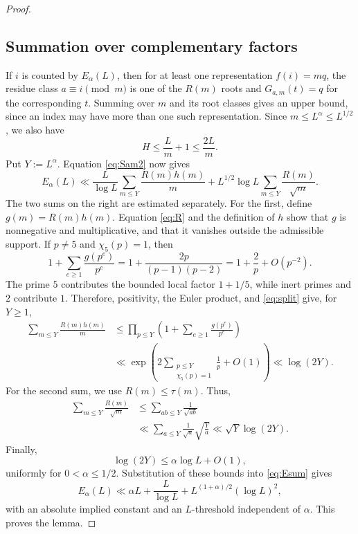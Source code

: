 \documentclass[11pt]{amsart}
\theoremstyle{definition}
\theoremstyle{remark}
\begin{document}
\begin{proof}
\subsection{Summation over complementary factors}

If $i$ is counted by $E_\alpha(L)$,
then for at least one representation $f(i)=mq$, the residue class
$a\equiv i\pmod m$ is one of the $R(m)$ roots and $G_{a,m}(t)=q$ for the
corresponding $t$. Summing over $m$ and its root classes gives an upper
bound, since an index may have more than one such representation.
Since $m\leq L^\alpha\leq L^{1/2}$, we also have
\[
H\leq\frac Lm+1\leq\frac{2L}{m}.
\]
Put $Y:=L^\alpha$.  Equation \eqref{eq:Sam2} now gives
\begin{equation}\label{eq:Esum}
E_\alpha(L)
\ll
\frac{L}{\log L}
\sum_{m\leq Y}\frac{R(m)h(m)}m
+L^{1/2}\log L
\sum_{m\leq Y}\frac{R(m)}{\sqrt m}.
\end{equation}
The two sums on the right are estimated separately.  For the first, define
$g(m)=R(m)h(m)$.  Equation \eqref{eq:R} and the definition of $h$ show that
$g$ is nonnegative and multiplicative, and that it vanishes outside the
admissible support.  If $p\neq5$ and $\chi_5(p)=1$, then
\[
1+\sum_{e\geq1}\frac{g(p^e)}{p^e}
=1+\frac{2p}{(p-1)(p-2)}
=1+\frac2p+O(p^{-2}).
\]
The prime $5$ contributes the bounded local factor $1+1/5$, while inert
primes and $2$ contribute $1$.  Therefore, positivity, the Euler product,
and \eqref{eq:split} give, for $Y\geq1$,
\begin{align*}
\sum_{m\leq Y}\frac{R(m)h(m)}m
&\leq
\prod_{p\leq Y}\left(1+\sum_{e\geq1}\frac{g(p^e)}{p^e}\right)\\
&\ll
\exp\left(
2\sum_{\substack{p\leq Y\\ \chi_5(p)=1}}\frac1p+O(1)
\right)
\ll\log(2Y).
\end{align*}
For the second sum, we use $R(m)\leq\tau(m)$.  Thus,
\begin{align*}
\sum_{m\leq Y}\frac{R(m)}{\sqrt m}
&\leq
\sum_{ab\leq Y}\frac1{\sqrt{ab}}\\
&\ll
\sum_{a\leq Y}\frac1{\sqrt a}\sqrt{\frac Ya}
\ll\sqrt Y\log(2Y).
\end{align*}
Finally,
\[
\log(2Y)\leq\alpha\log L+O(1),
\]
uniformly for $0<\alpha\leq1/2$.  Substitution of these bounds into
\eqref{eq:Esum} gives
\[
E_\alpha(L)
\ll \alpha L+\frac{L}{\log L}
+L^{(1+\alpha)/2}(\log L)^2,
\]
with an absolute implied constant and an $L$-threshold independent of
$\alpha$.  This proves the lemma.
\end{proof}
\end{document}
